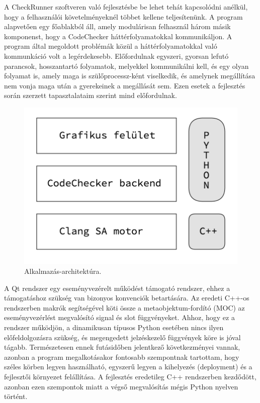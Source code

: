 \documentclass[a4paper,12pt]{report}
\begin{document}
A CheckRunner szoftveren való fejlesztésbe be lehet tehát kapcsolódni anélkül, hogy a felhasználói követelményeknél többet kellene teljesítenünk. A program alapvetően egy főablakból áll, amely modulárisan felhasznál három másik komponenst, hogy a CodeChecker háttérfolyamatokkal kommunikáljon. A program által megoldott problémák közül a háttérfolyamatokkal való kommunkáció volt a legérdekesebb. Előfordulnak egyszeri, gyorsan lefutó parancsok, hosszantartó folyamatok, melyekkel kommunikálni kell, és egy olyan folyamat is, amely maga is szülőprocessz-ként viselkedik, és amelynek megállítása nem vonja maga után a gyerekeinek a megállását sem. Ezen esetek a fejlesztés során szerzett tapasztalataim szerint mind előfordulnak.

\begin{figure}[h]
\caption{Alkalmazás-architektúra.}
\centering
\includegraphics[scale=0.4]{architektura.png}
\end{figure}

A Qt rendszer egy eseményvezérelt működést támogató rendszer, ehhez a támogatáshoz szükség van bizonyos konvenciók betartására. Az eredeti C++-os rendszerben makrók segítségével köti össze a metaobjektum-fordító (MOC) az eseményvezérlést megvalósító signal és slot függvényeket. Ahhoz, hogy ez a rendszer működjön, a dinamikusan típusos Python esetében nincs ilyen előfeldolgozásra szükség, és megengedett jelzéskezelő függvények köre is jóval tágabb. Természetesen ennek futásidőben jelentkező következményei vannak, azonban a  program megalkotásakor fontosabb szempontnak tartottam, hogy széles körben legyen használható, egyszerű legyen a kihelyezés (deployment) és a fejlesztői környezet felállítása. A fejlesztés eredetileg C++ rendszerben kezdődött, azonban ezen szempontok miatt a végső megvalósítás mégis Python nyelven történt.
\end{document}
